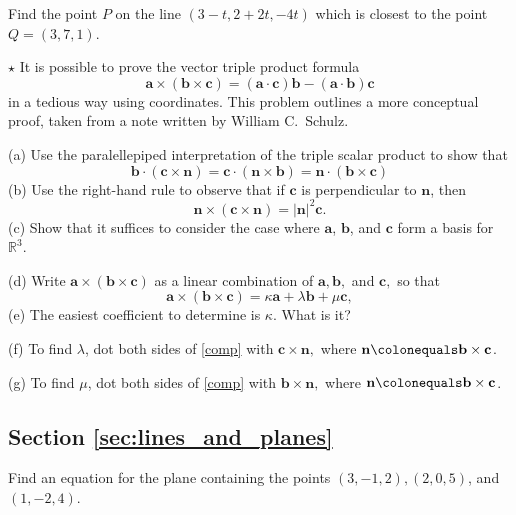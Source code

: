 \documentclass[svgnames]{watsonbook}
\begin{document}
\begin{exercise}{}{}
  Find the point $P$ on the line $(3-t,2+2t,-4t)$ which is closest to the point $Q=(3,7,1)$.
\end{exercise}

\begin{exercise}{$\star$}{}
  It is possible to prove the vector triple product formula
  \[
    \mathbf{a}\times(\mathbf{b}\times\mathbf{c}) =
    (\mathbf{a}\cdot\mathbf{c})\mathbf{b} -
    (\mathbf{a}\cdot\mathbf{b})\mathbf{c}
  \]
  in a tedious way using coordinates. This problem outlines a more
  conceptual proof, taken from a note written by William C.\ Schulz.

  (a) Use the paralellepiped interpretation of the triple scalar
  product to show that
  \[
    \mathbf{b}\cdot(\mathbf{c}\times\mathbf{n}) =
    \mathbf{c}\cdot(\mathbf{n}\times\mathbf{b}) =
    \mathbf{n}\cdot(\mathbf{b}\times\mathbf{c})
  \]
  (b) Use the right-hand rule to observe that if $\mathbf{c}$ is
  perpendicular to $\mathbf{n}$, then
  \[
    \mathbf{n}\times(\mathbf{c}\times\mathbf{n}) =
    |\mathbf{n}|^2\mathbf{c}.
  \]
  (c) Show that it suffices to consider the case where $\mathbf{a}$,
  $\mathbf{b}$, and $\mathbf{c}$ form a basis for $\mathbb{R}^3$.

  (d) Write $\mathbf{a}\times(\mathbf{b}\times\mathbf{c})$ as a linear
  combination of $\mathbf{a}, \mathbf{b},$ and $\mathbf{c},$ so that
  \begin{equation} \label{comp}
    \mathbf{a}\times(\mathbf{b}\times\mathbf{c}) = \kappa
    \mathbf{a}+\lambda \mathbf{b}+\mu\mathbf{c},
  \end{equation} 
  (e) The easiest coefficient to determine is $\kappa$. What is it?

  (f) To find $\lambda$, dot both sides of \eqref{comp} with
  $\mathbf{c}\times \mathbf{n},$ where
  $\mathbf{n}\colonequals \mathbf{b}\times\mathbf{c}$.

  (g) To find $\mu$, dot both sides of \eqref{comp} with
  $\mathbf{b}\times \mathbf{n},$ where
  $\mathbf{n}\colonequals \mathbf{b}\times\mathbf{c}$.
\end{exercise}

\subsection*{Section \ref{sec:lines_and_planes}}

\begin{exercise}{}{}
  Find an equation for the plane containing the points $(3, -1, 2),
  (2, 0, 5)$, and $(1, -2, 4)$.
\end{exercise}
\end{document}
